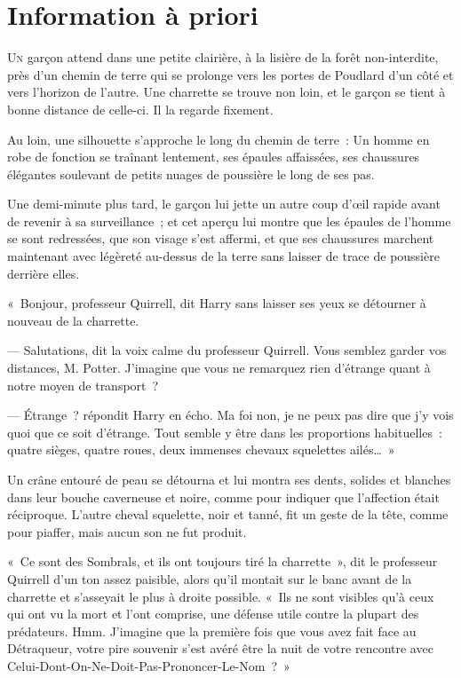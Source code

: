 \chapter{Information à priori}

\lettrine{U}{n} garçon attend dans une petite clairière, à la lisière de la forêt non-interdite, près d'un chemin de terre qui se prolonge vers les portes de Poudlard d'un côté et vers l'horizon de l'autre. Une charrette se trouve non loin, et le garçon se tient à bonne distance de celle-ci. Il la regarde fixement.

Au loin, une silhouette s'approche le long du chemin de terre~: Un homme en robe de fonction se traînant lentement, ses épaules affaissées, ses chaussures élégantes soulevant de petits nuages de poussière le long de ses pas.

Une demi-minute plus tard, le garçon lui jette un autre coup d'œil rapide avant de revenir à sa surveillance~; et cet aperçu lui montre que les épaules de l'homme se sont redressées, que son visage s'est affermi, et que ses chaussures marchent maintenant avec légèreté au-dessus de la terre sans laisser de trace de poussière derrière elles.

«~Bonjour, professeur Quirrell, dit Harry sans laisser ses yeux se détourner à nouveau de la charrette.

--- Salutations, dit la voix calme du professeur Quirrell. Vous semblez garder vos distances, M. Potter. J'imagine que vous ne remarquez rien d'étrange quant à notre moyen de transport~?

--- Étrange~? répondit Harry en écho. Ma foi non, je ne peux pas dire que j'y vois quoi que ce soit d'étrange. Tout semble y être dans les proportions habituelles~: quatre sièges, quatre roues, deux immenses chevaux squelettes ailés…~»

Un crâne entouré de peau se détourna et lui montra ses dents, solides et blanches dans leur bouche caverneuse et noire, comme pour indiquer que l'affection était réciproque. L'autre cheval squelette, noir et tanné, fit un geste de la tête, comme pour piaffer, mais aucun son ne fut produit.

«~Ce sont des Sombrals, et ils ont toujours tiré la charrette~», dit le professeur Quirrell d'un ton assez paisible, alors qu'il montait sur le banc avant de la charrette et s'asseyait le plus à droite possible. «~Ils ne sont visibles qu'à ceux qui ont vu la mort et l'ont comprise, une défense utile contre la plupart des prédateurs. Hmm. J'imagine que la première fois que vous avez fait face au Détraqueur, votre pire souvenir s'est avéré être la nuit de votre rencontre avec Celui-Dont-On-Ne-Doit-Pas-Prononcer-Le-Nom~?~»

